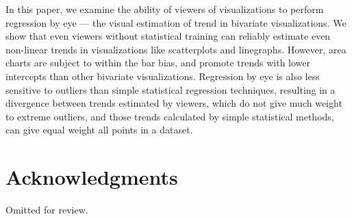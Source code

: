 \documentclass{sigchi}
\begin{document}
In this paper, we examine the ability of viewers of visualizations to perform regression by eye --- the visual estimation of trend in bivariate visualizations. We show that even viewers without statistical training can reliably estimate even non-linear trends in visualizations like scatterplots and linegraphs. However, area charts are subject to within the bar bias, and promote trends with lower intercepts than other bivariate visualizations. Regression by eye is also less sensitive to outliers than simple statistical regression techniques, resulting in a divergence between trends estimated by viewers, which do not give much weight to extreme outliers, and those trends calculated by simple statistical methods, can give equal weight all points in a dataset.


\section{Acknowledgments}

Omitted for review.

%
%
%
%
%
\balance{}




\end{document}
